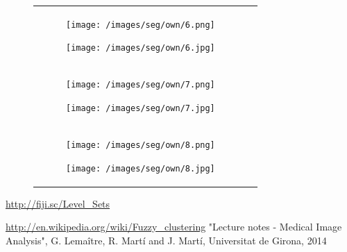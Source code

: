 \documentclass[a4paper, 10pt, conference]{ieeeconf}        %
\begin{document}
\begin{figure}[ht!]
\begin{tabular}{c c}
\begin{subfigure}{0.2\textwidth}
  \texttt{[image: /images/seg/own/6.png]}\caption{}
  \end{subfigure}
  \begin{subfigure}{0.2\textwidth}
  \texttt{[image: /images/seg/own/6.jpg]}\caption{}
  \end{subfigure}\\
 \begin{subfigure}{0.2\textwidth}
  \texttt{[image: /images/seg/own/7.png]}\caption{}
  \end{subfigure}
  \begin{subfigure}{0.2\textwidth}
  \texttt{[image: /images/seg/own/7.jpg]}\caption{}
  \end{subfigure}\\
 \begin{subfigure}{0.2\textwidth}
  \texttt{[image: /images/seg/own/8.png]}\caption{}
  \end{subfigure}
  \begin{subfigure}{0.2\textwidth}
  \texttt{[image: /images/seg/own/8.jpg]}\caption{}
  \end{subfigure}\\    
 \end{tabular}
 \end{figure}
 


%
\clearpage
\begin{thebibliography}{99}
\url{http://fiji.sc/Level_Sets}

\url{http://en.wikipedia.org/wiki/Fuzzy_clustering}
"Lecture notes - Medical Image Analysis", G. Lemaître, R. Martí and J. Martí, Universitat de Girona, 2014
\end{thebibliography}
\end{document}

